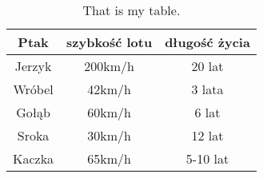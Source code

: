 \begin{table}[htbp]
\centering
\begin{tabular}{||c|c|c||}
 \hline
 Ptak & szybkość lotu & długość życia \\ [0.5ex]
 \hline\hline
 Jerzyk & 200km/h & 20 lat \\
 \hline
 Wróbel & 42km/h & 3 lata \\
 \hline
 Gołąb & 60km/h & 6 lat \\
 \hline
 Sroka & 30km/h & 12 lat \\
 \hline
 Kaczka & 65km/h & 5-10 lat \\
 \hline
\end{tabular}
\label{tab:ptaszki}
\caption{That is my table.}
\end{table}